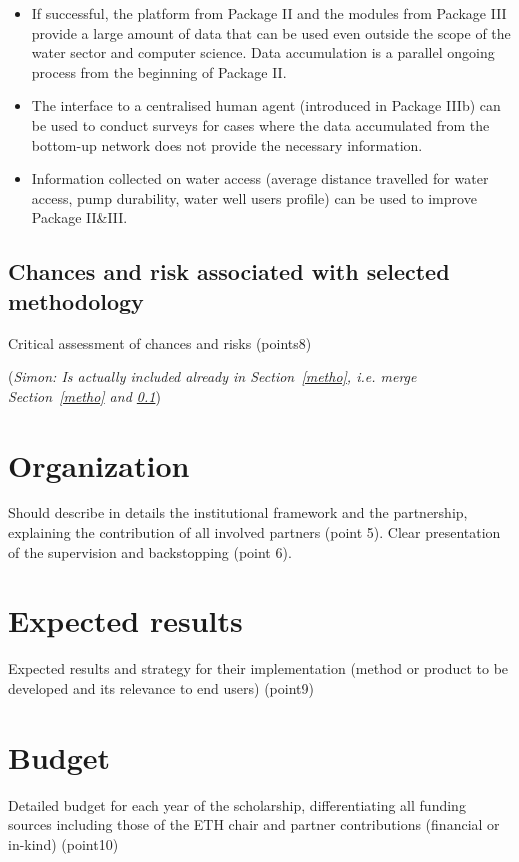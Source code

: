 \documentclass[11pt]{article}
\newcommand{\simon}[1]{\vspace{1em}(\emph{Simon: #1})\vspace{1em}}
\begin{document}
\begin{itemize}
 \item If successful, the platform from Package II and the modules from Package III provide a large amount of data that can be used even outside the scope of the water sector and computer science. Data accumulation is a parallel ongoing process from the beginning of Package II.
 \item The interface to a centralised human agent (introduced in Package IIIb) can be used to conduct surveys for cases where the data accumulated from the bottom-up network does not provide the necessary information.
 
 \item Information collected on water access (average distance travelled for water access, pump durability, water well users profile) can be used to improve Package II\&III.
\end{itemize}



\subsection{Chances and risk associated with selected methodology}\label{risk}
Critical assessment of chances and risks (points8)

\simon{Is actually included already in Section~\ref{metho}, i.e. merge Section~\ref{metho} and \ref{risk}}

\section{Organization}\label{organization}
Should describe in details the institutional framework and the partnership, explaining the contribution of all involved partners (point 5). Clear presentation of the supervision and backstopping (point 6).
\section{Expected results}\label{expected}
Expected results and strategy for their implementation (method or product to be developed and its relevance to end users) (point9)
\section{Budget}
Detailed budget for each year of the scholarship, differentiating all funding sources including those of the ETH chair and partner contributions (financial or in-kind) (point10)




\end{document}
